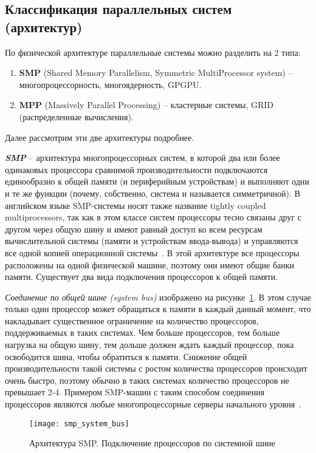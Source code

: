 \subsection{Классификация параллельных систем (архитектур)}

По физической архитектуре параллельные системы можно разделить на 2 типа:

\begin{enumerate}
    \item\textbf{SMP} (Shared Memory Parallelism, Symmetric MultiProcessor system) – многопроцессорность, многоядерность, GPGPU. 
    \item\textbf{MPP} (Massively Parallel Processing) – кластерные системы, GRID (распределенные вычисления).
\end{enumerate}

Далее рассмотрим эти две архитектуры подробнее.

\textbf{\textit{SMP}} -- архитектура многопроцессорных систем, в которой два или более одинаковых процессора сравнимой производительности подключаются единообразно к общей памяти (и периферийным устройствам) и выполняют одни и те же функции (почему, собственно, система и называется симметричной). В английском языке SMP-системы носят также название tightly coupled multiprocessors, так как в этом классе систем процессоры тесно связаны друг с другом через общую шину и имеют равный доступ ко всем ресурсам вычислительной системы (памяти и устройствам ввода-вывода) и управляются все одной копией операционной системы~\cite{SymmetricMultiprocessingWP}. В этой архитектуре все процессоры расположены на одной физической машине, поэтому они имеют общие банки памяти. Существует два вида подключения процессоров к общей памяти.

\textit{Соединение по общей шине (system bus)} изображено на рисунке~\ref{SMPSystemBus:image}. В этом случае только один процессор может обращаться к памяти в каждый данный момент, что накладывает существенное ограничение на количество процессоров, поддерживаемых в таких системах. Чем больше процессоров, тем больше нагрузка на общую шину, тем дольше должен ждать каждый процессор, пока освободится шина, чтобы обратиться к памяти. Снижение общей производительности такой системы с ростом количества процессоров происходит очень быстро, поэтому обычно в таких системах количество процессоров не превышает 2-4. Примером SMP-машин с таким способом соединения процессоров являются любые многопроцессорные серверы начального уровня~\cite{Martyshkin2014}.

\begin{figure}[H]
    \texttt{[image: smp\_system\_bus]}
    \caption{Архитектура SMP. Подключение процессоров по системной шине}
    \label{SMPSystemBus:image}
\end{figure}


